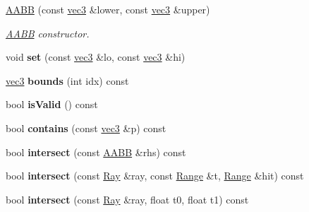 \begin{DoxyCompactItemize}
\item 
\hyperlink{classps_1_1base_1_1AABB_a78c7d9aba281e1d79af5ed9606ae67aa}{A\+A\+B\+B} (const \hyperlink{classps_1_1base_1_1Vec3}{vec3} \&lower, const \hyperlink{classps_1_1base_1_1Vec3}{vec3} \&upper)
\begin{DoxyCompactList}\small\item\em \hyperlink{classps_1_1base_1_1AABB}{A\+A\+B\+B} constructor. \end{DoxyCompactList}\item 
\hypertarget{classps_1_1base_1_1AABB_a3c29d0908f8e0de2bb0c940abd1ad597}{}void {\bfseries set} (const \hyperlink{classps_1_1base_1_1Vec3}{vec3} \&lo, const \hyperlink{classps_1_1base_1_1Vec3}{vec3} \&hi)\label{classps_1_1base_1_1AABB_a3c29d0908f8e0de2bb0c940abd1ad597}

\item 
\hypertarget{classps_1_1base_1_1AABB_a1283f56b8991b9c9b0f106f7799e75f7}{}\hyperlink{classps_1_1base_1_1Vec3}{vec3} {\bfseries bounds} (int idx) const \label{classps_1_1base_1_1AABB_a1283f56b8991b9c9b0f106f7799e75f7}

\item 
\hypertarget{classps_1_1base_1_1AABB_ab5e504286a222c6fb8b9b13a74b1054c}{}bool {\bfseries is\+Valid} () const \label{classps_1_1base_1_1AABB_ab5e504286a222c6fb8b9b13a74b1054c}

\item 
\hypertarget{classps_1_1base_1_1AABB_a05a4bfffe188d066d5e873b3103e7c0e}{}bool {\bfseries contains} (const \hyperlink{classps_1_1base_1_1Vec3}{vec3} \&p) const \label{classps_1_1base_1_1AABB_a05a4bfffe188d066d5e873b3103e7c0e}

\item 
\hypertarget{classps_1_1base_1_1AABB_a72dd61c8c70df720936068b99e2f20ab}{}bool {\bfseries intersect} (const \hyperlink{classps_1_1base_1_1AABB}{A\+A\+B\+B} \&rhs) const \label{classps_1_1base_1_1AABB_a72dd61c8c70df720936068b99e2f20ab}

\item 
\hypertarget{classps_1_1base_1_1AABB_addf7a0a3a1e808b00da21ed2ca05ca21}{}bool {\bfseries intersect} (const \hyperlink{classps_1_1base_1_1Ray}{Ray} \&ray, const \hyperlink{classps_1_1base_1_1Interval}{Range} \&t, \hyperlink{classps_1_1base_1_1Interval}{Range} \&hit) const \label{classps_1_1base_1_1AABB_addf7a0a3a1e808b00da21ed2ca05ca21}

\item 
\hypertarget{classps_1_1base_1_1AABB_ad1a26b813b04c38b66990c3c9ae95498}{}bool {\bfseries intersect} (const \hyperlink{classps_1_1base_1_1Ray}{Ray} \&ray, float t0, float t1) const \label{classps_1_1base_1_1AABB_ad1a26b813b04c38b66990c3c9ae95498}


\end{DoxyCompactItemize}
